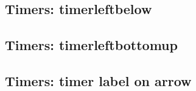 \documentclass[a4paper]{article}
\begin{document}
\subsection{Timers: timerleftbelow}

{
\begin{pktxdiag}[]
\testx
\end{pktxdiag}
\hfill
\begin{pktxdiag}[]
\testxi
\end{pktxdiag}

\begin{hpktxdiag}
\testx
\end{hpktxdiag}

\bigskip

\begin{hpktxdiag}
\testxi
\end{hpktxdiag}
}

\subsection{Timers: timerleftbottomup}

{
\begin{pktxdiag}[]
\testx
\end{pktxdiag}
\hfill
\begin{pktxdiag}[]
\testxi
\end{pktxdiag}

\begin{hpktxdiag}
\testx
\end{hpktxdiag}

\bigskip

\begin{hpktxdiag}
\testxi
\end{hpktxdiag}
}
\vfill

\subsection{Timers: timer label on arrow}

{
\begin{pktxdiag}[]
\testx
\end{pktxdiag}
\hfill
\begin{pktxdiag}[]
\testxi
\end{pktxdiag}

\begin{hpktxdiag}
\testx
\end{hpktxdiag}

\bigskip

\begin{hpktxdiag}
\testxi
\end{hpktxdiag}
}
\end{document}
